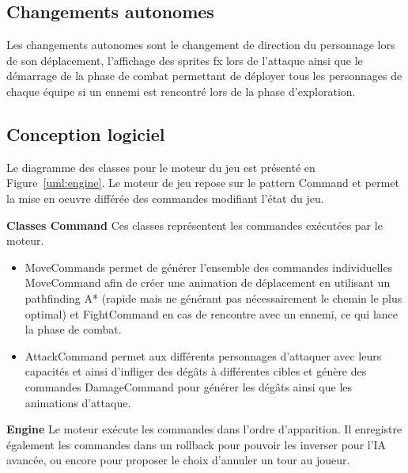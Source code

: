 \documentclass[a4paper,12pt]{article}
\begin{document}
\subsection{Changements autonomes}
	Les changements autonomes sont le changement de direction du personnage lors de son déplacement, l'affichage des sprites fx lors de l'attaque ainsi que le démarrage de la phase de combat permettant de déployer tous les personnages de chaque équipe si un ennemi est rencontré lors de la phase d'exploration.

\subsection{Conception logiciel}

Le diagramme des classes pour le moteur du jeu est présenté en Figure~\ref{uml:engine}. Le moteur de jeu repose sur le pattern Command et permet la mise en oeuvre différée des commandes modifiant l'état du jeu.

\textbf{Classes Command} Ces classes représentent les commandes exécutées par le moteur. 
\begin{itemize}
\item MoveCommands permet de générer l'ensemble des commandes individuelles MoveCommand afin de créer une animation de déplacement en utilisant un pathfinding A* (rapide mais ne générant pas nécessairement le chemin le plus optimal) et FightCommand en cas de rencontre avec un ennemi, ce qui lance la phase de combat.
\item AttackCommand permet aux différents personnages d'attaquer avec leurs capacités et ainsi d'infliger des dégâts à différentes cibles et génère des commandes DamageCommand pour générer les dégâts ainsi que les animations d'attaque.
\end{itemize}


\textbf{Engine} Le moteur exécute les commandes dans l'ordre d'apparition. Il enregistre également les commandes dans un rollback pour pouvoir les inverser pour l'IA avancée, ou encore pour proposer le choix d'annuler un tour au joueur.
\end{document}
